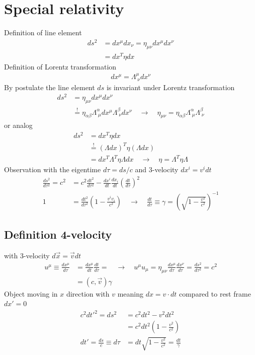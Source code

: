 \documentclass[10pt,a4paper]{book}
\theoremstyle{definition}
\begin{document}
\section{Special relativity}
Definition of line element
\begin{align}
    ds^2 &= dx^\mu dx_\nu = \eta_{\mu\nu}dx^\mu dx^\nu\\
        &= dx^T\eta dx
\end{align}
Definition of Lorentz transformation
\begin{align}
    dx^\mu = \Lambda^\mu_{\;\nu}dx^\nu
\end{align}
By postulate the line element $ds$ is invariant under Lorentz transformation
\begin{align}
    ds^2 &= \eta_{\mu\nu}dx^\mu dx^\nu\\
    &\stackrel{!}{=} \eta_{\alpha\beta}\Lambda^\alpha_{\;\mu}dx^\mu \Lambda^\beta_{\;\nu}dx^\nu\quad\rightarrow\quad \eta_{\mu\nu} = \eta_{\alpha\beta}\Lambda^\alpha_{\;\mu} \Lambda^\beta_{\;\nu}
\end{align}
or analog
\begin{align}
    ds^2 &= dx^T\eta dx\\
    &\stackrel{!}{=} (\Lambda dx)^T\eta (\Lambda dx)\\
    &= dx^T\Lambda^T\eta \Lambda dx\quad\rightarrow\quad \eta = \Lambda^T\eta\Lambda
\end{align}
Observation with the eigentime $d\tau=ds/c$ and 3-velocity $dx^i = v^i dt$
\begin{align}
    \frac{ds^2}{d\tau^2}=c^2&=c^2\frac{dt^2}{d\tau^2}-\frac{dx^i}{dt}\frac{dx_i}{dt}\left(\frac{dt}{d\tau}\right)^2\\
    1&=\frac{dt^2}{d\tau^2}\left(1-\frac{v^iv_i}{c^2}\right)\quad\rightarrow\quad\frac{dt}{d\tau}\equiv\gamma=\left(\sqrt{1-\frac{v^2}{c^2}}\right)^{-1}
\end{align}

\subsection{Definition 4-velocity}
with 3-velocity $d\vec{x} = \vec{v} dt$
\begin{align}
    u^\mu\equiv\frac{dx^\mu}{d\tau}&=\frac{dx^\mu}{dt}\frac{dt}{d\tau}=\quad\rightarrow\quad u^\mu u_\mu=\eta_{\mu\nu}\frac{dx^\mu}{d\tau} \frac{dx^\nu}{d\tau}=\frac{ds^2}{d\tau^2}=c^2\\
    &=(c,\vec{v})\gamma
\end{align}
Object moving in $x$ direction with $v$ meaning $dx=v\cdot dt$ compared to
rest frame $dx'=0$
\begin{align}
    c^2dt'^2=ds^2 &= c^2dt^2- v^2 dt^2\\
    &=c^2dt^2\left(1-\frac{v^2}{c^2}\right)\\
    dt'=\frac{ds}{c}\equiv d\tau&=dt\sqrt{1-\frac{v^2}{c^2}}=\frac{dt}{\gamma}
\end{align}
\end{document}
